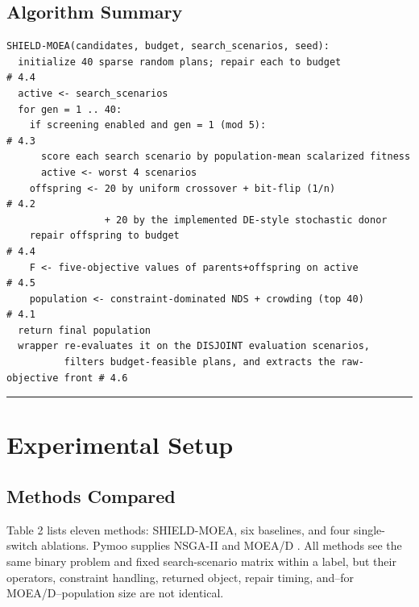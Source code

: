\documentclass[energies,article,submit,moreauthors]{Definitions/mdpi}
\begin{document}
\subsection{Algorithm Summary}\label{algorithm-summary}

\begin{verbatim}
SHIELD-MOEA(candidates, budget, search_scenarios, seed):
  initialize 40 sparse random plans; repair each to budget            # 4.4
  active <- search_scenarios
  for gen = 1 .. 40:
    if screening enabled and gen = 1 (mod 5):                         # 4.3
      score each search scenario by population-mean scalarized fitness
      active <- worst 4 scenarios
    offspring <- 20 by uniform crossover + bit-flip (1/n)             # 4.2
                 + 20 by the implemented DE-style stochastic donor
    repair offspring to budget                                        # 4.4
    F <- five-objective values of parents+offspring on active         # 4.5
    population <- constraint-dominated NDS + crowding (top 40)        # 4.1
  return final population
  wrapper re-evaluates it on the DISJOINT evaluation scenarios,
          filters budget-feasible plans, and extracts the raw-objective front # 4.6
\end{verbatim}

\begin{center}\rule{0.5\linewidth}{0.5pt}\end{center}

\section{Experimental Setup}\label{experimental-setup}

\subsection{Methods Compared}\label{methods-compared}

Table 2 lists eleven methods: SHIELD-MOEA, six baselines, and four single-switch ablations. Pymoo supplies NSGA-II and MOEA/D \cite{ref43}. All methods see the same binary problem and fixed search-scenario matrix within a label, but their operators, constraint handling, returned object, repair timing, and--for MOEA/D--population size are not identical.
\end{document}
